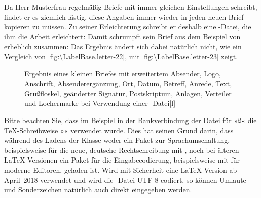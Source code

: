 \begin{Example}
  Da Herr Musterfrau regelmäßig Briefe mit immer gleichen Einstellungen
  schreibt, findet er es ziemlich lästig, diese Angaben immer wieder in jeden
  neuen Brief kopieren zu müssen. Zu seiner Erleichterung schreibt er deshalb
  eine -Datei, die ihm die Arbeit erleichtert:%
  Damit schrumpft sein Brief aus dem Beispiel von
   erheblich zusammen:
  Das Ergebnis ändert sich dabei natürlich nicht, wie ein Vergleich von
  \autoref{fig:\LabelBase.letter-22}, 
  mit \autoref{fig:\LabelBase.letter-23} zeigt.
  \begin{figure}
    \setcapindent{0pt}%
    \begin{captionbeside}{Ergebnis eines
        kleinen Briefes mit erweitertem Absender, Logo, Anschrift,
        Absenderergänzung, Ort, Datum, Betreff, Anrede, Text, Grußfloskel,
        geänderter Signatur, Postskriptum, Anlagen, Verteiler und Lochermarke
        bei Verwendung einer -Datei}[l]
    \end{captionbeside}
    \label{fig:\LabelBase.letter-23}
  \end{figure}
\end{Example}

Bitte beachten Sie, dass im Beispiel in der Bankverbindung
der Datei  für »ß« die \TeX-Schreibweise »« verwendet
wurde. Dies hat seinen Grund darin, dass während des Ladens der Klasse weder
ein Paket zur Sprachumschaltung, beispielsweise für die neue, deutsche
Rechtschreibung mit ,
noch bei älteren \LaTeX-Versionen ein Paket für die Eingabecodierung,
beispielsweise mit 
für moderne Editoren, geladen ist. Wird mit Sicherheit eine \LaTeX-Version ab
April~2018 verwendet und wird die -Datei UTF-8 codiert, so können
Umlaute und Sonderzeichen natürlich auch direkt eingegeben werden.


